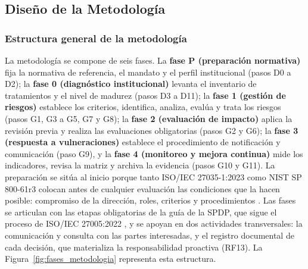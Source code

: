 \subsection{Diseño de la Metodología}
\label{sec:diseno_solucion}

\subsubsection{Estructura general de la metodología}

La metodología se compone de seis fases. La \textbf{fase P (preparación normativa)} fija la normativa de referencia, el mandato y el perfil institucional (pasos D0 a D2); la \textbf{fase 0 (diagnóstico institucional)} levanta el inventario de tratamientos y el nivel de madurez (pasos D3 a D11); la \textbf{fase 1 (gestión de riesgos)} establece los criterios, identifica, analiza, evalúa y trata los riesgos (pasos G1, G3 a G5, G7 y G8); la \textbf{fase 2 (evaluación de impacto)} aplica la revisión previa y realiza las evaluaciones obligatorias (pasos G2 y G6); la \textbf{fase 3 (respuesta a vulneraciones)} establece el procedimiento de notificación y comunicación (paso G9), y la \textbf{fase 4 (monitoreo y mejora continua)} mide los indicadores, revisa la matriz y archiva la evidencia (pasos G10 y G11). La preparación se sitúa al inicio porque tanto ISO/IEC 27035-1:2023 como NIST SP 800-61r3 colocan antes de cualquier evaluación las condiciones que la hacen posible: compromiso de la dirección, roles, criterios y procedimientos \cite{iso27035_1_2023,iso27035_2_2023,nist2025sp80061r3}. Las fases se articulan con las etapas obligatorias de la guía de la SPDP, que sigue el proceso de ISO/IEC 27005:2022 \cite{spdp2026guiav2,iso27005_2022}, y se apoyan en dos actividades transversales: la comunicación y consulta con las partes interesadas, y el registro documental de cada decisión, que materializa la responsabilidad proactiva (RF13). La Figura~\ref{fig:fases_metodologia} representa esta estructura.

